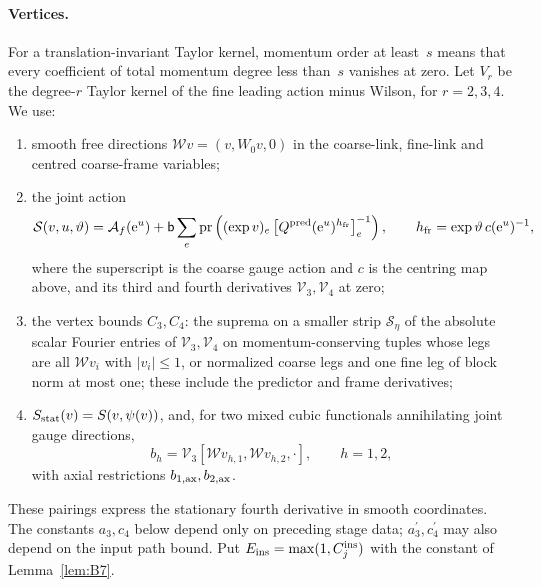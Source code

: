 \paragraph{Vertices.} For a translation-invariant Taylor kernel, momentum order at least~$s$ means that every coefficient of total momentum degree less than~$s$ vanishes at zero. Let $V_r$ be the degree-$r$ Taylor kernel of the fine leading action minus Wilson, for $r=2,3,4$. We use:
\begin{enumerate}[label=(\alph*)]
\item smooth free directions $\mathcal Wv=(v,W_0v,0)$ in the coarse-link, fine-link and centred coarse-frame variables;
\item the joint action
\begin{equation*}
\mathcal S(v,u,\vartheta)=\mathcal A_f(\mathrm e^u)+\mathsf{b}\sum_e\operatorname{pr}\left((\exp v)_e\left[Q^{\rm pred}(\mathrm e^u)^{h_{\rm fr}}\right]_e^{-1}\right),\qquad
h_{\rm fr}=\exp\vartheta\,c(\mathrm e^u)^{-1},
\end{equation*}
where the superscript is the coarse gauge action and $c$ is the centring map above, and its third and fourth derivatives $\mathcal V_3,\mathcal V_4$ at zero;
\item the vertex bounds $C_3,C_4$: the suprema on a smaller strip $\mathcal S_\eta$ of the absolute scalar Fourier entries of $\mathcal V_3,\mathcal V_4$ on momentum-conserving tuples whose legs are all $\mathcal Wv_i$ with $|v_i|\le1$, or normalized coarse legs and one fine leg of block norm at most one; these include the predictor and frame derivatives;
\item $S_{\rm stat}(v)=S(v,\psi(v))$, and, for two mixed cubic functionals annihilating joint gauge directions,
\begin{equation*}
b_h=\mathcal V_3[\mathcal Wv_{h,1},\mathcal Wv_{h,2},\cdot],\qquad h=1,2,
\end{equation*}
with axial restrictions $b_{1,\rm ax},b_{2,\rm ax}$.
\end{enumerate}
These pairings express the stationary fourth derivative in smooth coordinates. The constants $a_3,c_4$ below depend only on preceding stage data; $a_3^\prime,c_4^\prime$ may also depend on the input path bound. Put $E_{\rm ins}=\max(1,C_j^{\rm ins})$ with the constant of Lemma~\ref{lem:B7}.

